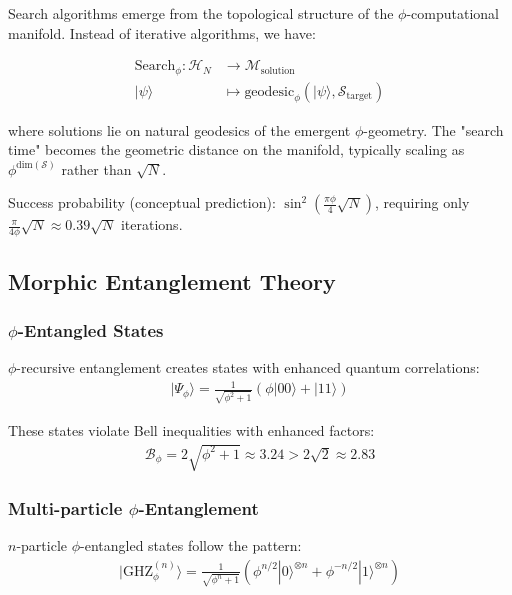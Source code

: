 Search algorithms emerge from the topological structure of the $\phi$-computational manifold. Instead of iterative algorithms, we have:

\begin{align}
\text{Search}_\phi: \mathcal{H}_N &\to \mathcal{M}_{\text{solution}} \\
|\psi\rangle &\mapsto \text{geodesic}_{\phi}\left(|\psi\rangle, \mathcal{S}_{\text{target}}\right)
\end{align}

where solutions lie on natural geodesics of the emergent $\phi$-geometry. The "search time" becomes the geometric distance on the manifold, typically scaling as $\phi^{\text{dim}(\mathcal{S})}$ rather than $\sqrt{N}$.

Success probability (conceptual prediction): $\sin^2\left(\frac{\pi\phi}{4}\sqrt{N}\right)$, requiring only $\frac{\pi}{4\phi}\sqrt{N} \approx 0.39\sqrt{N}$ iterations.

\subsection{Morphic Entanglement Theory}

\subsubsection{$\phi$-Entangled States}

$\phi$-recursive entanglement creates states with enhanced quantum correlations:
\begin{align}
|\Psi_\phi\rangle = \frac{1}{\sqrt{\phi^2 + 1}} \left(\phi|00\rangle + |11\rangle\right)
\end{align}

These states violate Bell inequalities with enhanced factors:
\begin{align}
\mathcal{B}_\phi = 2\sqrt{\phi^2 + 1} \approx 3.24 > 2\sqrt{2} \approx 2.83
\end{align}

\subsubsection{Multi-particle $\phi$-Entanglement}

$n$-particle $\phi$-entangled states follow the pattern:
\begin{align}
|\text{GHZ}_\phi^{(n)}\rangle = \frac{1}{\sqrt{\phi^n + 1}} \left(\phi^{n/2}|0\rangle^{\otimes n} + \phi^{-n/2}|1\rangle^{\otimes n}\right)
\end{align}

